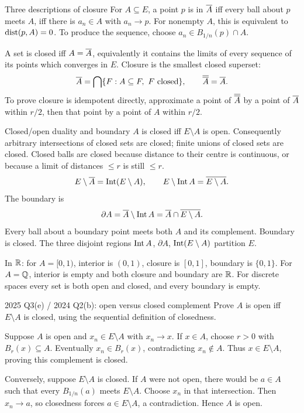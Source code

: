 \begin{note}{Three descriptions of closure}
For $A\subseteq E$, a point $p$ is in $\overline{A}$ iff every ball about $p$ meets $A$, iff there is $a_n\in A$ with $a_n\to p$. For nonempty $A$, this is equivalent to $\operatorname{dist}(p,A)=0$. To produce the sequence, choose $a_n\in B_{1/n}(p)\cap A$.

A set is closed iff $A=\overline{A}$, equivalently it contains the limits of every sequence of its points which converges in $E$. Closure is the smallest closed superset:
\[\overline{A}=\bigcap\{F:A\subseteq F,\ F\text{ closed}\},\qquad\overline{\overline{A}}=\overline{A}.\]
To prove closure is idempotent directly, approximate a point of $\overline{\overline{A}}$ by a point of $\overline{A}$ within $r/2$, then that point by a point of $A$ within $r/2$.
\end{note}
\begin{note}{Closed/open duality and boundary}
$A$ is closed iff $E\setminus A$ is open. Consequently arbitrary intersections of closed sets are closed; finite unions of closed sets are closed. Closed balls are closed because distance to their centre is continuous, or because a limit of distances $\le r$ is still $\le r$.
\[E\setminus\overline{A}=\operatorname{Int}(E\setminus A),\qquad E\setminus\operatorname{Int} A=\overline{E\setminus A}.\]
The boundary is
\[\partial A=\overline{A}\setminus\operatorname{Int} A=\overline{A}\cap\overline{E\setminus A}.\]
Every ball about a boundary point meets both $A$ and its complement. Boundary is closed. The three disjoint regions $\operatorname{Int} A$, $\partial A$, $\operatorname{Int}(E\setminus A)$ partition $E$.

In $\mathbb R$: for $A=[0,1)$, interior is $(0,1)$, closure is $[0,1]$, boundary is $\{0,1\}$. For $A=\mathbb Q$, interior is empty and both closure and boundary are $\mathbb R$. For discrete spaces every set is both open and closed, and every boundary is empty.
\end{note}
\begin{exam}{2025 Q3(e) / 2024 Q2(b): open versus closed complement}
Prove $A$ is open iff $E\setminus A$ is closed, using the sequential definition of closedness.
\end{exam}
\begin{answer}
Suppose $A$ is open and $x_n\in E\setminus A$ with $x_n\to x$. If $x\in A$, choose $r>0$ with $B_r(x)\subseteq A$. Eventually $x_n\in B_r(x)$, contradicting $x_n\notin A$. Thus $x\in E\setminus A$, proving this complement is closed.

Conversely, suppose $E\setminus A$ is closed. If $A$ were not open, there would be $a\in A$ such that every $B_{1/n}(a)$ meets $E\setminus A$. Choose $x_n$ in that intersection. Then $x_n\to a$, so closedness forces $a\in E\setminus A$, a contradiction. Hence $A$ is open.
\end{answer}

